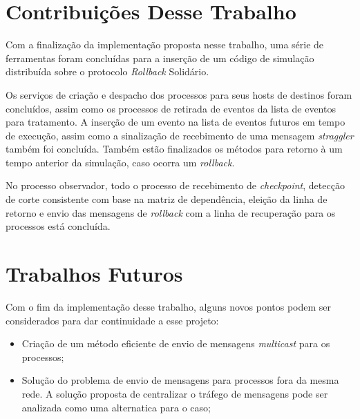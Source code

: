 \section{Contribuições Desse Trabalho}
Com a finalização da implementação proposta nesse trabalho, uma série de ferramentas foram concluídas para a inserção de um código de simulação distribuída sobre o protocolo \textit{Rollback} Solidário.

Os serviços de criação e despacho dos processos para seus hosts de destinos foram concluídos, assim como os processos de retirada de eventos da lista de eventos para tratamento. A inserção de um evento na lista de eventos futuros em tempo de execução, assim como a sinalização de recebimento de uma mensagem \textit{straggler} também foi concluída. Também estão finalizados os métodos para retorno à um tempo anterior da simulação, caso ocorra um \textit{rollback}.

No processo observador, todo o processo de recebimento de \textit{checkpoint}, detecção de corte consistente com base na matriz de dependência, eleição da linha de retorno e envio das mensagens de \textit{rollback} com a linha de recuperação para os processos está concluída.



\section{Trabalhos Futuros}

Com o fim da implementação desse trabalho, alguns novos pontos podem ser considerados para dar continuidade a esse projeto:
\begin{itemize}
	\item Criação de um método eficiente de envio de mensagens \textit{multicast} para os processos;
	\item Solução do problema de envio de mensagens para processos fora da mesma rede. A solução proposta de centralizar o tráfego de mensagens pode ser analizada como uma alternatica para o caso;
\end{itemize}